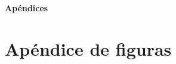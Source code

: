 \documentclass[12pt,twoside,titlepage]{report}
\begin{document}
\newpage





\appendix

{}

\mbox{}
\vfill
\begin{center}
\begin{Huge}
\textbf{Apéndices}
\end{Huge}
\end{center}
\vfill
\mbox{}
\thispagestyle{empty}

\newpage
\mbox{}
\thispagestyle{empty}
\newpage


\chapter{Apéndice de figuras}
\label{sec:apendice}



\end{document}
